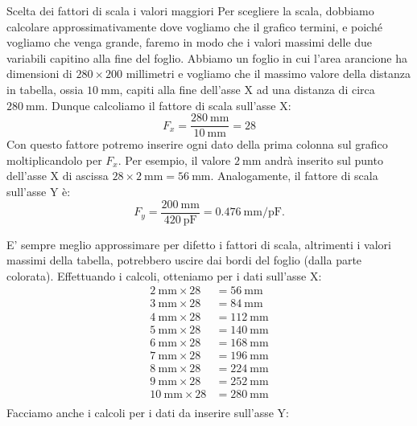 \documentclass[12pt,a4paper,oneside]{book}
\makeatletter
\renewcommand{\subsection}{\@startsection {subsection}{2}{\z@}
{-3ex \@plus -0.1ex \@minus -.4ex}
{0.5ex \@plus.2ex }
{\color[rgb]{0.141,0.596,0.749}\normalfont\sffamily\bfseries}}
\theoremstyle{esercizio}
\makeatother
\begin{document}
\subsection{Scelta dei fattori di scala i valori maggiori} 
Per scegliere la scala, dobbiamo calcolare approssimativamente dove vogliamo che il grafico termini, e poiché vogliamo che venga grande, faremo in modo che i valori massimi delle due variabili capitino alla fine del foglio. Abbiamo un foglio in cui l'area arancione ha   dimensioni di $280 \times 200 $ millimetri e vogliamo che il massimo valore della distanza in tabella, ossia $\SI{10}{\milli\meter}$, capiti alla fine dell'asse X ad una distanza di circa $\SI{280}{\milli\meter}$. Dunque calcoliamo il fattore di scala sull'asse X:
\[
F_x=\frac{\SI{280}{\milli\meter}}{\SI{10}{\milli\meter}} = 28
\]
Con questo fattore potremo inserire ogni dato della prima colonna sul grafico moltiplicandolo per $F_x$. Per esempio, il valore $\SI{2}{\milli\meter}$ andrà inserito sul punto dell'asse X di ascissa $28\times\SI{2}{\milli\meter} = \SI{56}{\milli\meter}$. Analogamente, il fattore di scala sull'asse Y è:
\[
F_y = \frac{\SI{200}{\milli\meter}}{\SI{420}{\pico\farad}} = \SI{0,476}{\milli\meter\per\pico\farad}.
\] 

E' sempre meglio approssimare per difetto i fattori di scala, altrimenti i valori massimi della tabella, potrebbero uscire dai bordi del foglio (dalla parte colorata).
Effettuando i calcoli, otteniamo per i dati sull'asse X:
\begin{equation*}
\begin{aligned}
\SI{2}{\milli\meter} \times 28 &= \SI{56}{\milli\meter}  \\
\SI{3}{\milli\meter}  \times 28 &= \SI{84}{\milli\meter}  \\
\SI{4}{\milli\meter}  \times 28 &= \SI{112}{\milli\meter}   \\
\SI{5}{\milli\meter}  \times 28 &= \SI{140}{\milli\meter}  \\
\SI{6}{\milli\meter}  \times 28 &= \SI{168}{\milli\meter}   \\
\SI{7}{\milli\meter}  \times 28 &= \SI{196}{\milli\meter}  \\
\SI{8}{\milli\meter}  \times 28 &= \SI{224}{\milli\meter}  \\
\SI{9}{\milli\meter}  \times 28 &= \SI{252}{\milli\meter}  \\
\SI{10}{\milli\meter}  \times 28 &= \SI{280}{\milli\meter}  \\
\end{aligned}
\end{equation*}
Facciamo anche i calcoli per i dati da inserire sull'asse Y:
\end{document}
